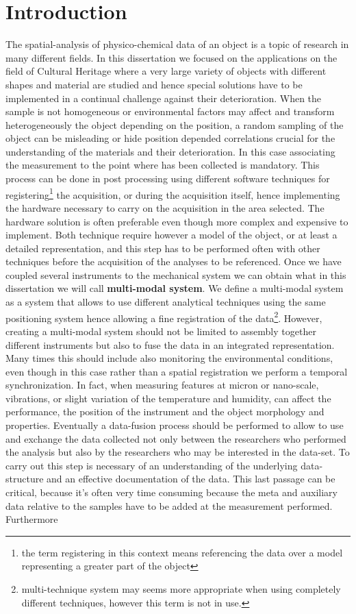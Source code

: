 \chapter*{Introduction}
The spatial-analysis of physico-chemical data of an object is a topic of research in many different fields. In this dissertation we focused on the applications on the field of Cultural Heritage where a very large variety of objects with different shapes and material are studied and hence special solutions have to be implemented in a continual challenge against their deterioration. When the sample is not homogeneous or environmental factors may affect and transform heterogeneously  the object depending on the position, a random sampling of the object can be misleading or hide position depended correlations crucial for the understanding of the materials and their deterioration. In this case associating the measurement to the point where has been collected is mandatory. This process can be done in post processing using different software techniques for registering\footnote{the term registering in this context means referencing the data over a model representing a greater part of the object} the acquisition, or during the acquisition itself, hence implementing the hardware necessary to carry on the acquisition in the area selected. The hardware solution is often preferable even though more complex and expensive to implement.  Both technique require however a model of the object, or at least a detailed representation, and this step  has to be performed often with other techniques before the acquisition of the analyses to be referenced.
Once we have coupled several instruments to the mechanical system we can obtain what in this dissertation we will call \textbf{multi-modal system}. We define a multi-modal system as a system that allows to use different analytical techniques using the same positioning system hence allowing a fine registration of the data\footnote{multi-technique system may seems more appropriate when using completely different techniques, however this term is not in use.}. However, creating a multi-modal system should not be limited to assembly together different instruments but also to fuse the data in an integrated representation.  Many times this should include also monitoring the environmental conditions, even though in this case rather than a spatial registration we perform a temporal synchronization. In fact, when measuring features at micron or nano-scale, vibrations, or slight variation of the temperature and humidity, can affect the performance, the position of the instrument and the object morphology and properties.
Eventually a data-fusion process should be performed to allow to use and exchange the data collected not only between the researchers who performed the analysis but also by the researchers who may be interested in the data-set.  To carry out this step is necessary of an understanding of the underlying data-structure and an effective documentation of the data. This last passage can be critical, because it's often very time consuming because the meta and auxiliary data relative to the samples have to be added at the measurement performed. Furthermore 

